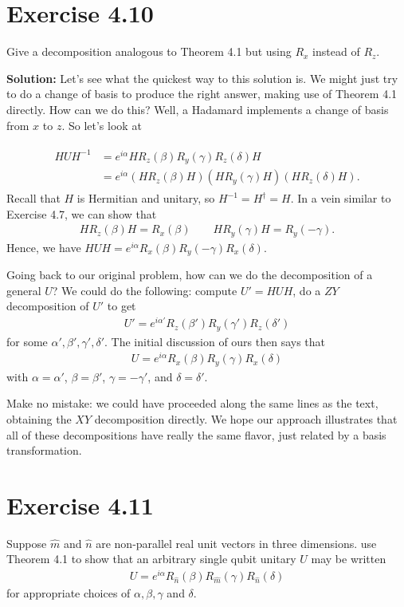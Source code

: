 \documentclass{book}
\begin{document}
\section*{Exercise 4.10}
    Give a decomposition analogous to Theorem 4.1 but using $R_x$ instead of $R_z$.

    \textbf{Solution:} Let's see what the quickest way to this solution is. We might just try to do a change of basis to produce the right answer, making use of Theorem 4.1 directly. How can we do this? Well, a Hadamard implements a change of basis from $x$ to $z$. So let's look at

    \begin{align}
    \begin{aligned}
        H U H^{-1} &= e^{i\alpha} H R_z(\beta) R_y(\gamma) R_z(\delta) H \\
        &=e^{i\alpha} \left(H R_z(\beta)H\right) \left(H R_y(\gamma) H\right) \left( H R_z(\delta) H\right).
    \end{aligned}
    \end{align}
    Recall that $H$ is Hermitian and unitary, so $H^{-1} = H^\dagger = H$. In a vein similar to Exercise 4.7, we can show that
    \begin{align}
        H R_z(\beta) H = R_x(\beta) \qquad H R_y(\gamma) H = R_y(-\gamma). 
    \end{align}
    Hence, we have $HUH = e^{i\alpha} R_x(\beta) R_y(-\gamma) R_x(\delta)$.

    Going back to our original problem, how can we do the decomposition of a general $U$? We could do the following: compute $U' = HUH$, do a $ZY$ decomposition of $U'$ to get
    \begin{align}
        U' = e^{i\alpha'}  R_z(\beta') R_y(\gamma') R_z(\delta') 
    \end{align}
    for some $\alpha', \beta', \gamma', \delta'$. The initial discussion of ours then says that 
    \begin{align}
        U = e^{i\alpha} R_x(\beta) R_y(\gamma) R_x(\delta)
    \end{align}
    with $\alpha = \alpha'$, $\beta = \beta'$, $\gamma = -\gamma'$, and $\delta = \delta'$.

    Make no mistake: we could have proceeded along the same lines as the text, obtaining the $XY$ decomposition directly. We hope our approach illustrates that all of these decompositions have really the same flavor, just related by a basis transformation.

\section*{Exercise 4.11}
    Suppose $\hat{m}$ and $\hat{n}$ are non-parallel real unit vectors in three dimensions. use Theorem 4.1 to show that an arbitrary single qubit unitary $U$ may be written
    \begin{align}
        U = e^{i\alpha} R_{\hat{n}}(\beta) R_{\hat{m}}(\gamma) R_{\hat{n}}(\delta)
    \end{align}
    for appropriate choices of $\alpha, \beta, \gamma$ and $\delta$.
\end{document}
